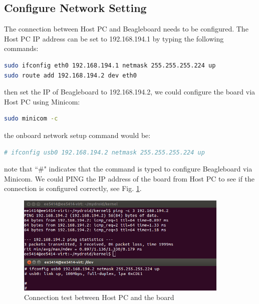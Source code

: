 \documentclass[12pt,journal,draftclsnofoot,onecolumn]{IEEEtran}
\begin{document}
    \subsection{Configure Network Setting}
The connection between Host PC and Beagleboard needs to be configured. The Host PC IP address can be set to 192.168.194.1 by typing the following commands:
\begin{lstlisting}[language={bash}]
sudo ifconfig eth0 192.168.194.1 netmask 255.255.255.224 up
sudo route add 192.168.194.2 dev eth0
\end{lstlisting}
then set the IP of Beagleboard to 192.168.194.2, we could configure the board via Host PC using Minicom:
\begin{lstlisting}[language={bash}]
sudo minicom -c
\end{lstlisting}
the onboard network setup command would be:
\begin{lstlisting}[language={bash}]
# ifconfig usb0 192.168.194.2 netmask 255.255.255.224 up
\end{lstlisting}
note that ``\#" indicates that the command is typed to configure Beagleboard via Minicom. We could PING the IP address of the board from Host PC to see if the connection is configured correctly, see Fig. \ref{lab1}.
\begin{figure}[ht]
    \centering
    \includegraphics[width=4in]{./figs/lab1.png}
    \caption{Connection test between Host PC and the board}
    \label{lab1}
\end{figure}
\end{document}
